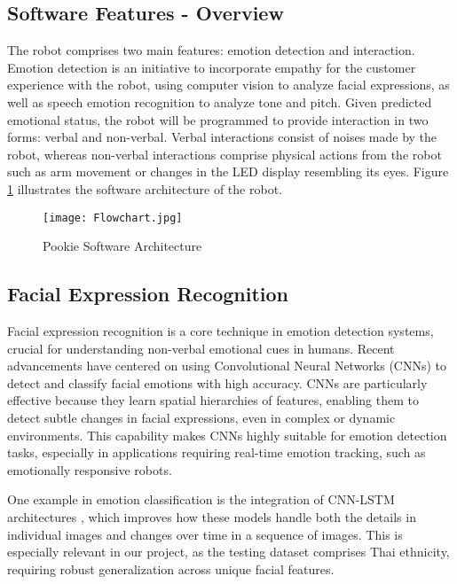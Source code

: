 \newpage
\subsection{Software Features - Overview}
The robot comprises two main features: emotion detection and interaction. Emotion detection is an initiative to incorporate empathy for the customer experience with the robot, using computer vision to analyze facial expressions, as well as speech emotion recognition to analyze tone and pitch. Given predicted emotional status, the robot will be programmed to provide interaction in two forms: verbal and non-verbal. Verbal interactions consist of noises made by the robot, whereas non-verbal interactions comprise physical actions from the robot such as arm movement or changes in the LED display resembling its eyes. Figure \ref{fig:soft_arch} illustrates the software architecture of the robot.

\begin{figure}[ht]
    \centering
    \captionsetup{justification=centering}
    \texttt{[image: Flowchart.jpg]}
    \caption{Pookie Software Architecture}
    \label{fig:soft_arch}
\end{figure}

\newpage
\subsection{Facial Expression Recognition}
Facial expression recognition is a core technique in emotion detection systems, crucial for understanding non-verbal emotional cues in humans. Recent advancements have centered on using Convolutional Neural Networks (CNNs) to detect and classify facial emotions with high accuracy. CNNs are particularly effective because they learn spatial hierarchies of features, enabling them to detect subtle changes in facial expressions, even in complex or dynamic environments. This capability makes CNNs highly suitable for emotion detection tasks, especially in applications requiring real-time emotion tracking, such as emotionally responsive robots.

One example in emotion classification is the integration of CNN-LSTM architectures \cite{RYUMINA2022435}, which improves how these models handle both the details in individual images and changes over time in a sequence of images. This is especially relevant in our project, as the testing dataset comprises Thai ethnicity, requiring robust generalization across unique facial features.

